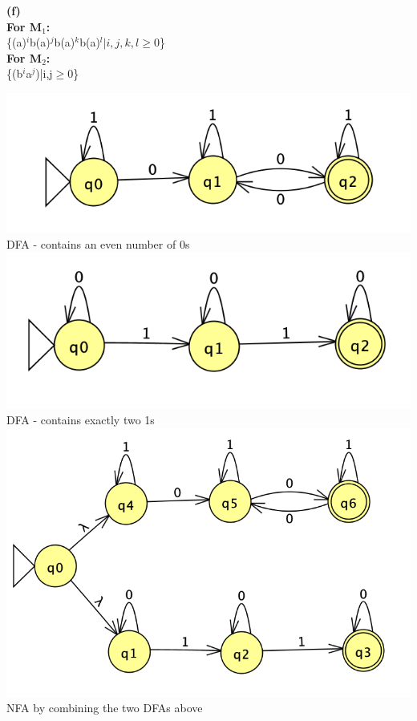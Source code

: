 \documentclass{homework}
\begin{document}
\textbf{(f)}\\
\textbf{For M$_1$:}\\
\{(a)$^i$b(a)$^j$b(a)$^k$b(a)$^l|i,j,k,l\geq0$\}\\
\textbf{For M$_2$:}\\
\{(b$^i$a$^j$)|i,j$\geq0$\}\\
\newline
\newline
\newline
\newline
\newline
\newline
\newline
\question
\begin{center}
\includegraphics{A1Q3DFA1.png}\\
DFA - contains an even number of 0s\\

\includegraphics{A1Q3DFA2.png}\\
DFA - contains exactly two 1s\\

\includegraphics{A1Q3NFAFinal.png}\\
NFA by combining the two DFAs above\\
\end{center}
\end{document}
